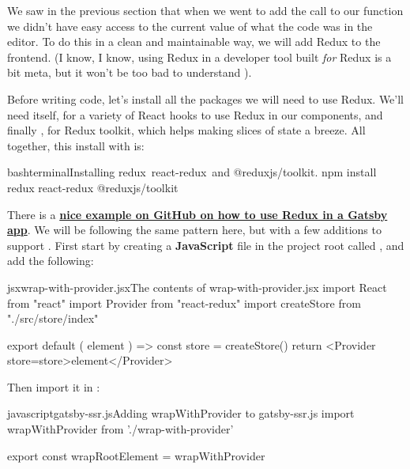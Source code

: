 \documentclass[paper=6in:9in,pagesize=pdftex,headinclude=on,footinclude=on,12pt,twoside]{scrbook}
\makeatletter
\newcommand{\link}[2]{\textbf{\textcolor{monokaiPink}{\href{#2}{#1}}}}
\newcommand{\at}{\makeatletter @\makeatother}
\makeatother
\begin{document}
We saw in the previous section that when we went to add the call to our  function we didn't have easy access to the current value of what the code was in the editor. To do this in a clean and maintainable way, we will add Redux to the frontend. (I know, I know, using Redux in a developer tool built \textit{for} Redux is a bit meta, but it won't be too bad to understand \wink). 


Before writing code, let's install all the packages we will need to use Redux. We'll need  itself,  for a variety of React hooks to use Redux in our components, and finally \index{\codeword{\at reduxjs/toolkit}}, for Redux toolkit, which helps making slices of state a breeze. All together, this install with  is:

\begin{codeInput}{bash}{terminal}{Installing redux\, react-redux\, and \at reduxjs/toolkit.}
npm install redux react-redux @reduxjs/toolkit
\end{codeInput}


There is a \link{nice example on GitHub on how to use Redux in a Gatsby app}{https://github.com/gatsbyjs/gatsby/tree/master/examples/using-redux}. We will be following the same pattern here, but with a few additions to support . First start by creating a \textbf{JavaScript} file in the project root called , and add the following:

\begin{codeInput}{jsx}{wrap-with-provider.jsx}{The contents of wrap-with-provider.jsx}
import React from "react"
import { Provider } from "react-redux"
import createStore from "./src/store/index"

export default ({ element }) => {
  const store = createStore()
  return <Provider store={store}>{element}</Provider>
}  
\end{codeInput}

Then import it in :

\begin{codeInput}{javascript}{gatsby-ssr.js}{Adding wrapWithProvider to gatsby-ssr.js}
import wrapWithProvider from './wrap-with-provider'

export const wrapRootElement = wrapWithProvider
\end{codeInput}
\end{document}

